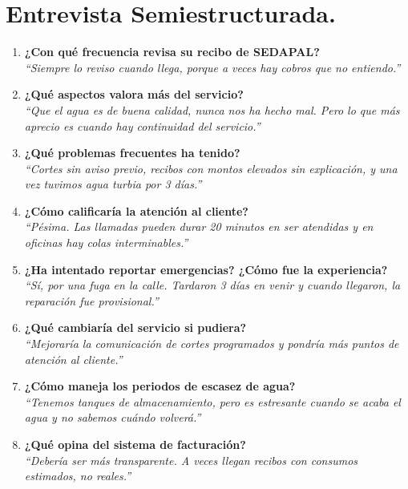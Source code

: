 \documentclass{article}
\begin{document}
\section*{Entrevista Semiestructurada.}

\begin{enumerate}
    \item \textbf{¿Con qué frecuencia revisa su recibo de SEDAPAL?} \\
    \textit{``Siempre lo reviso cuando llega, porque a veces hay cobros que no entiendo.''}
    
    \item \textbf{¿Qué aspectos valora más del servicio?} \\
    \textit{``Que el agua es de buena calidad, nunca nos ha hecho mal. Pero lo que más aprecio es cuando hay continuidad del servicio.''}
    
    \item \textbf{¿Qué problemas frecuentes ha tenido?} \\
    \textit{``Cortes sin aviso previo, recibos con montos elevados sin explicación, y una vez tuvimos agua turbia por 3 días.''}
    
    \item \textbf{¿Cómo calificaría la atención al cliente?} \\
    \textit{``Pésima. Las llamadas pueden durar 20 minutos en ser atendidas y en oficinas hay colas interminables.''}
    
    \item \textbf{¿Ha intentado reportar emergencias? ¿Cómo fue la experiencia?} \\
    \textit{``Sí, por una fuga en la calle. Tardaron 3 días en venir y cuando llegaron, la reparación fue provisional.''}
    
    \item \textbf{¿Qué cambiaría del servicio si pudiera?} \\
    \textit{``Mejoraría la comunicación de cortes programados y pondría más puntos de atención al cliente.''}
    
    \item \textbf{¿Cómo maneja los periodos de escasez de agua?} \\
    \textit{``Tenemos tanques de almacenamiento, pero es estresante cuando se acaba el agua y no sabemos cuándo volverá.''}
    
    \item \textbf{¿Qué opina del sistema de facturación?} \\
    \textit{``Debería ser más transparente. A veces llegan recibos con consumos estimados, no reales.''}
\end{enumerate}
\newpage
\end{document}
